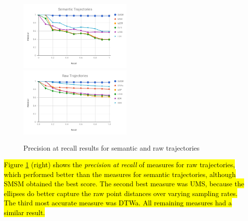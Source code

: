 \documentclass[12pt]{article}
\begin{document}
\begin{figure}[ht!]
\centering
\centerline{
\includegraphics[width=0.5\textwidth]{Images/P_R-chart_San_Francisco.png}
\includegraphics[width=0.5\textwidth]{Images/P_R-chart_San_Francisco-raw.png}
}
\caption{ Precision at recall results for semantic and raw trajectories}
\label{fig:sanfrancisco_precision_recall}
\end{figure}



\hl{Figure {\ref{fig:sanfrancisco_precision_recall}} (right) shows the \emph{precision at recall} of measures for raw trajectories, which performed better than the measures for semantic trajectories, although SMSM obtained the best score. The second best measure was UMS, because the ellipses do better capture the raw point distances over varying sampling rates. The third most accurate measure was DTWa.  
All remaining measures had a similar result. 
}
\end{document}
